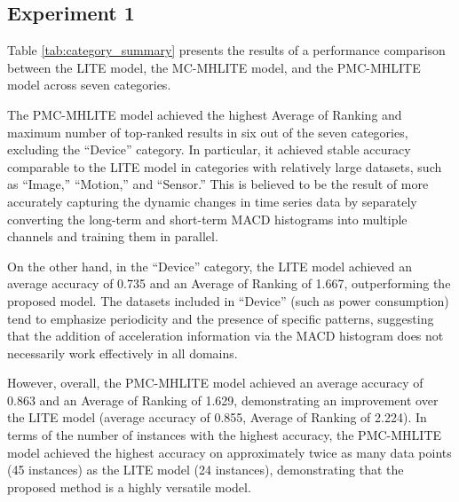 \documentclass[conference]{IEEEtran}
\begin{document}
\subsection{Experiment 1}

Table \ref{tab:category_summary} presents the results of a performance comparison between the LITE model, the MC-MHLITE model, and the PMC-MHLITE model across seven categories.


The PMC-MHLITE model achieved the highest Average of Ranking and maximum number of top-ranked results in six out of the seven categories, excluding the “Device” category. In particular, it achieved stable accuracy comparable to the LITE model in categories with relatively large datasets, such as “Image,” “Motion,” and “Sensor.” This is believed to be the result of more accurately capturing the dynamic changes in time series data by separately converting the long-term and short-term MACD histograms into multiple channels and training them in parallel.


On the other hand, in the “Device” category, the LITE model achieved an average accuracy of 0.735 and an Average of Ranking of 1.667, outperforming the proposed model. The datasets included in “Device” (such as power consumption) tend to emphasize periodicity and the presence of specific patterns, suggesting that the addition of acceleration information via the MACD histogram does not necessarily work effectively in all domains.


However, overall, the PMC-MHLITE model achieved an average accuracy of 0.863 and an Average of Ranking of 1.629, demonstrating an improvement over the LITE model (average accuracy of 0.855, Average of Ranking of 2.224). In terms of the number of instances with the highest accuracy, the PMC-MHLITE model achieved the highest accuracy on approximately twice as many data points (45 instances) as the LITE model (24 instances), demonstrating that the proposed method is a highly versatile model.
\end{document}
